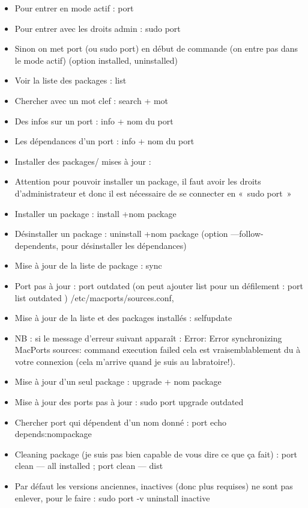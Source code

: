 \begin{itemize}
\item
  Pour entrer en mode actif : port
\item
  Pour entrer avec les droits admin : sudo port
\item
  Sinon on met port (ou sudo port) en début de commande (on entre pas
  dans le mode actif) (option installed, uninstalled)
\item
  Voir la liste des packages : list
\item
  Chercher avec un mot clef : search + mot
\item
  Des infos sur un port : info + nom du port
\item
  Les dépendances d'un port : info + nom du port
\item
  Installer des packages/ mises à jour :
\item
  Attention pour pouvoir installer un package, il faut avoir les droits
  d'administrateur et donc il est nécessaire de se connecter en «~sudo
  port~»
\item
  Installer un package : install +nom package
\item
  Désinstaller un package : uninstall +nom package (option
  ---follow-dependents, pour désinstaller les dépendances)
\item
  Mise à jour de la liste de package : sync
\item
  Port pas à jour : port outdated (on peut ajouter list pour un
  défilement : port list outdated ) /etc/macports/sources.conf,
\item
  Mise à jour de la liste et des packages installés : selfupdate
\item
  NB : si le message d'erreur suivant apparaît : Error: Error
  synchronizing MacPorts sources: command execution failed cela est
  vraisemblablement du à votre connexion (cela m'arrive quand je suis au
  labratoire!).
\item
  Mise à jour d'un seul package : upgrade + nom package
\item
  Mise à jour des ports pas à jour : sudo port upgrade outdated
\item
  Chercher port qui dépendent d'un nom donné : port echo
  depends:nompackage
\item
  Cleaning package (je suis pas bien capable de vous dire ce que ça
  fait) : port clean --- all installed ; port clean --- dist
\item
  Par défaut les versions anciennes, inactives (donc plus requises) ne
  sont pas enlever, pour le faire : sudo port -v uninstall inactive

\end{itemize}

